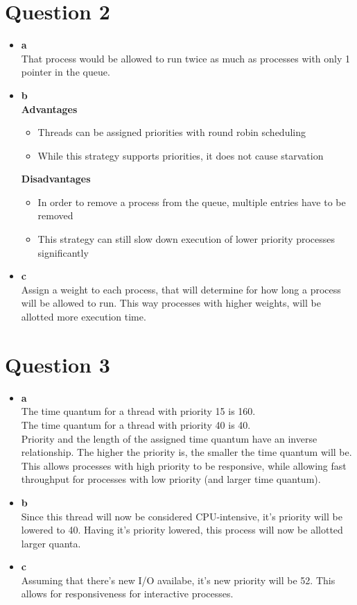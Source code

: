 \documentclass[12pt]{article}
\begin{document}
\section*{Question 2}
\begin{itemize}
\item \textbf{a} \\
  That process would be allowed to run twice as much as processes with only 1 pointer in the queue.
\item \textbf{b} \\
  \textbf{Advantages}
  \begin{itemize}
    \item Threads can be assigned priorities with round robin scheduling
    \item While this strategy supports priorities, it does not cause starvation
  \end{itemize}
  \textbf{Disadvantages}
  \begin{itemize}
    \item In order to remove a process from the queue, multiple entries have to be removed
    \item This strategy can still slow down execution of lower priority processes significantly
  \end{itemize}
\item \textbf{c} \\
  Assign a weight to each process, that will determine for how long a process will be allowed to run.
  This way processes with higher weights, will be allotted more execution time.
\end{itemize}

\section*{Question 3}\label{results}
\begin{itemize}
\item \textbf{a} \\
  The time quantum for a thread with priority 15 is 160. \\
  The time quantum for a thread with priority 40 is 40. \\
  Priority and the length of the assigned time quantum have an inverse relationship.
  The higher the priority is, the smaller the time quantum will be.
  This allows processes with high priority to be responsive,
  while allowing fast throughput for processes with low priority (and larger time quantum).
\item \textbf{b} \\
  Since this thread will now be considered CPU-intensive, it's priority will be lowered to 40.
  Having it's priority lowered, this process will now be allotted larger quanta.
\item \textbf{c} \\
  Assuming that there's new I/O availabe, it's new priority will be 52.
  This allows for responsiveness for interactive processes.
\end{itemize}
\end{document}
